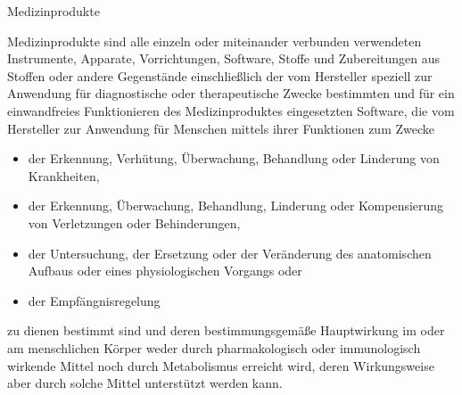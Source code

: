 \documentclass[aspectratio=169,t]{beamer}
\begin{document}
\begin{frame}{Medizinprodukte}
    \footnotesize{
        Medizinprodukte sind alle einzeln oder miteinander verbunden verwendeten Instrumente, Apparate, Vorrichtungen, Software, Stoffe und Zubereitungen aus Stoffen oder andere Gegenstände einschließlich der vom Hersteller speziell zur Anwendung für diagnostische oder therapeutische Zwecke bestimmten und für ein einwandfreies Funktionieren des Medizinproduktes eingesetzten Software, die vom Hersteller zur Anwendung für Menschen mittels ihrer Funktionen zum Zwecke
        \begin{itemize}
            \item der Erkennung, Verhütung, Überwachung, Behandlung oder Linderung von Krankheiten,
            \item der Erkennung, Überwachung, Behandlung, Linderung oder Kompensierung von Verletzungen oder Behinderungen,
            \item der Untersuchung, der Ersetzung oder der Veränderung des anatomischen Aufbaus oder eines physiologischen Vorgangs oder
            \item der Empfängnisregelung
        \end{itemize}
        zu dienen bestimmt sind und deren bestimmungsgemäße Hauptwirkung im oder am menschlichen Körper weder durch pharmakologisch oder immunologisch wirkende Mittel noch durch Metabolismus erreicht wird, deren Wirkungsweise aber durch solche Mittel unterstützt werden kann.
    }
\end{frame}
\end{document}
